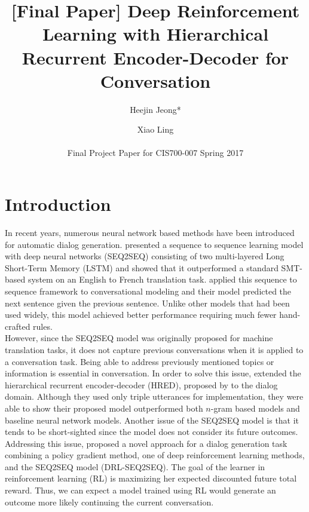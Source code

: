 \documentclass[letterpaper]{article}
\begin{document}
%
\title{[Final Paper] Deep Reinforcement Learning with Hierarchical Recurrent Encoder-Decoder for Conversation }
\author{Heejin Jeong* \and Xiao Ling \\ \\
  Final Project Paper for CIS700-007 Spring 2017\\}

\maketitle

\section{Introduction}
In recent years, numerous neural network based methods have been introduced for automatic dialog generation. \cite{Sutskever} presented a sequence to sequence learning model with deep neural networks (SEQ2SEQ) consisting of two multi-layered Long Short-Term Memory (LSTM) and showed that it outperformed a standard SMT-based system on an English to French translation task. \cite{Vinyals} applied this sequence to sequence framework to conversational modeling and their model predicted the next sentence given the previous sentence. Unlike other models that had been used widely, this model achieved better performance requiring much fewer hand-crafted rules. \\
However, since the SEQ2SEQ model was originally proposed for machine translation tasks, it does not capture previous conversations when it is applied to a conversation task. Being able to address previously mentioned topics or information is essential in conversation. In order to solve this issue, \cite{Serban} extended the hierarchical recurrent encoder-decoder (HRED), proposed by \cite{Sordoni} to the dialog domain. Although they used only triple utterances for implementation, they were able to show their proposed model outperformed both $n$-gram based models and baseline neural network models. Another issue of the SEQ2SEQ model is that it tends to be short-sighted since the model does not consider its future outcomes. Addressing this issue, \cite{Li} proposed a novel approach for a dialog generation task combining a policy gradient method, one of deep reinforcement learning methods, and the SEQ2SEQ model (DRL-SEQ2SEQ). The goal of the learner in reinforcement learning (RL) is maximizing her expected discounted future total reward. Thus, we can expect a model trained using RL would generate an outcome more likely continuing the current conversation. \\
\end{document}
